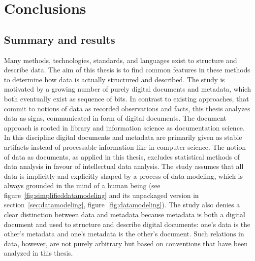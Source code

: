 \chapter{Conclusions}
\label{ch:conclusion}

\section{Summary and results}
\label{sec:summary}

Many methods, technologies, standards, and languages exist to structure and
describe data. The aim of this thesis is to find common features in these
methods to determine how data is actually structured and described. The study
is motivated by a growing number of purely digital documents and metadata,
which both eventually exist as sequence of bits. In contrast to existing
approaches, that commit to notions of data as recorded observations and facts,
this thesis analyzes data as signs, communicated in form of digital documents.
The document approach is rooted in library and information science as
documentation science. In this discipline digital documents and metadata are
primarily given as stable artifacts instead of processable information like in
computer science. The notion of data as documents, as applied in this thesis,
excludes statistical methods of data analysis in favour of intellectual data
analysis. The study assumes that all data is implicitly and explicitly shaped
by a process of data modeling, which is always grounded in the mind of a human
being (see figure~\ref{fig:simplifieddatamodeling} and its unpackaged version
in section~\ref{sec:datamodeling}, figure~\ref{fig:datamodeling}). The study
also denies a clear distinction between data and metadata because metadata is
both a digital document and used to structure and describe digital documents:
one's data is the other's metadata and one's metadata is the other's document.
Such relations in data, however, are not purely arbitrary but based on
conventions that have been analyzed in this thesis.

